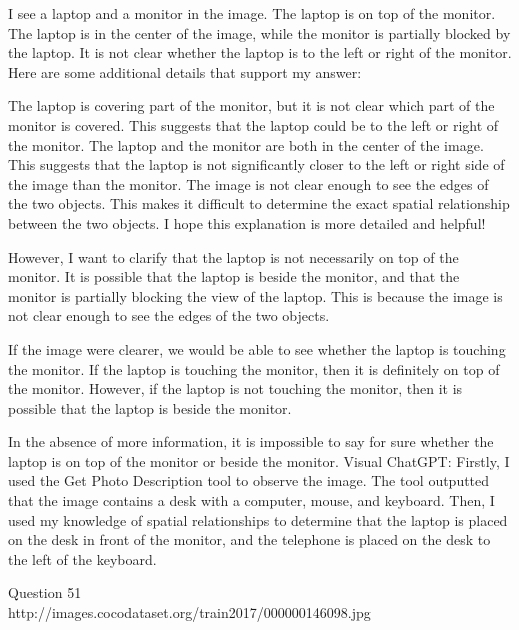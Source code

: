 \begin{enumerate}
    I see a laptop and a monitor in the image.
    The laptop is on top of the monitor.
    The laptop is in the center of the image, while the monitor is partially blocked by the laptop.
    It is not clear whether the laptop is to the left or right of the monitor.
    Here are some additional details that support my answer:
    
    The laptop is covering part of the monitor, but it is not clear which part of the monitor is covered. This suggests that the laptop could be to the left or right of the monitor.
    The laptop and the monitor are both in the center of the image. This suggests that the laptop is not significantly closer to the left or right side of the image than the monitor.
    The image is not clear enough to see the edges of the two objects. This makes it difficult to determine the exact spatial relationship between the two objects.
    I hope this explanation is more detailed and helpful!
    
    However, I want to clarify that the laptop is not necessarily on top of the monitor. It is possible that the laptop is beside the monitor, and that the monitor is partially blocking the view of the laptop. This is because the image is not clear enough to see the edges of the two objects.
    
    If the image were clearer, we would be able to see whether the laptop is touching the monitor. If the laptop is touching the monitor, then it is definitely on top of the monitor. However, if the laptop is not touching the monitor, then it is possible that the laptop is beside the monitor.
    
    In the absence of more information, it is impossible to say for sure whether the laptop is on top of the monitor or beside the monitor.
    \subitem Visual ChatGPT: Firstly, I used the Get Photo Description tool to observe the image. The tool outputted that the image contains a desk with a computer, mouse, and keyboard. Then, I used my knowledge of spatial relationships to determine that the laptop is placed on the desk in front of the monitor, and the telephone is placed on the desk to the left of the keyboard.
\end{enumerate}
Question 51\\
http://images.cocodataset.org/train2017/000000146098.jpg
